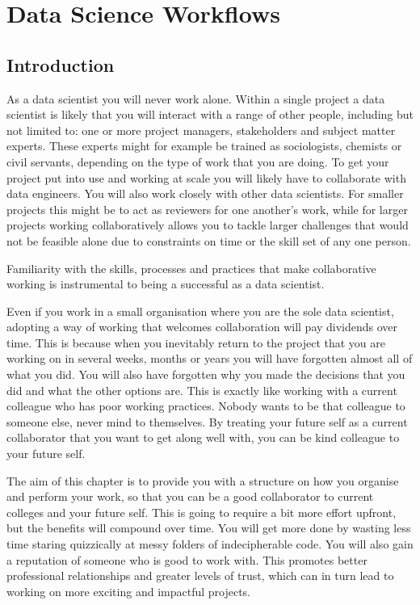 \documentclass[
  12pt,
]{book}
\theoremstyle{definition}
\theoremstyle{definition}
\theoremstyle{definition}
\theoremstyle{definition}
\theoremstyle{remark}
\begin{document}
\hypertarget{workflows}{%
\chapter{Data Science Workflows}\label{workflows}}

\hypertarget{introduction}{%
\section{Introduction}\label{introduction}}

As a data scientist you will never work alone. Within a single project a data scientist is likely that you will interact with a range of other people, including but not limited to: one or more project managers, stakeholders and subject matter experts. These experts might for example be trained as sociologists, chemists or civil servants, depending on the type of work that you are doing. To get your project put into use and working at scale you will likely have to collaborate with data engineers. You will also work closely with other data scientists. For smaller projects this might be to act as reviewers for one another's work, while for larger projects working collaboratively allows you to tackle larger challenges that would not be feasible alone due to constraints on time or the skill set of any one person.

Familiarity with the skills, processes and practices that make collaborative working is instrumental to being a successful as a data scientist.

Even if you work in a small organisation where you are the sole data scientist, adopting a way of working that welcomes collaboration will pay dividends over time. This is because when you inevitably return to the project that you are working on in several weeks, months or years you will have forgotten almost all of what you did. You will also have forgotten why you made the decisions that you did and what the other options are. This is exactly like working with a current colleague who has poor working practices. Nobody wants to be that colleague to someone else, never mind to themselves. By treating your future self as a current collaborator that you want to get along well with, you can be kind colleague to your future self.

The aim of this chapter is to provide you with a structure on how you organise and perform your work, so that you can be a good collaborator to current colleges and your future self. This is going to require a bit more effort upfront, but the benefits will compound over time. You will get more done by wasting less time staring quizzically at messy folders of indecipherable code. You will also gain a reputation of someone who is good to work with. This promotes better professional relationships and greater levels of trust, which can in turn lead to working on more exciting and impactful projects.
\end{document}
